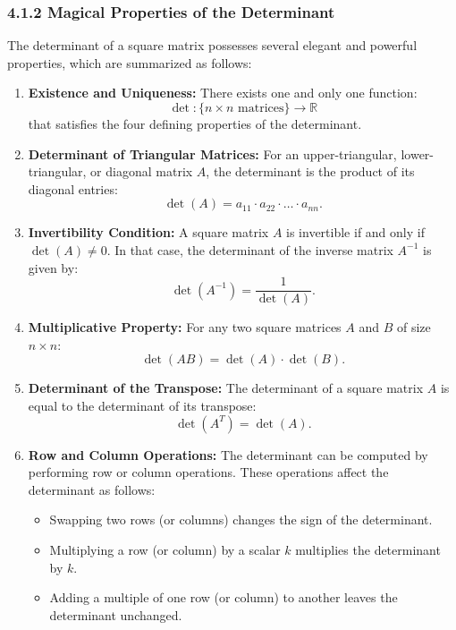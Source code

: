 \documentclass[a4paper,12pt]{article}
\begin{document}
\subsubsection*{4.1.2 Magical Properties of the Determinant}

The determinant of a square matrix possesses several elegant and powerful properties, which are summarized as follows:

\begin{enumerate}
    \item \textbf{Existence and Uniqueness:}  
    There exists one and only one function:  
    \[
    \det: \{n \times n \text{ matrices}\} \to \mathbb{R}
    \]
    that satisfies the four defining properties of the determinant.

    \item \textbf{Determinant of Triangular Matrices:}  
    For an upper-triangular, lower-triangular, or diagonal matrix \( A \), the determinant is the product of its diagonal entries:  
    \[
    \det(A) = a_{11} \cdot a_{22} \cdot \dots \cdot a_{nn}.
    \]

    \item \textbf{Invertibility Condition:}  
    A square matrix \( A \) is invertible if and only if \( \det(A) \neq 0 \). In that case, the determinant of the inverse matrix \( A^{-1} \) is given by:  
    \[
    \det(A^{-1}) = \frac{1}{\det(A)}.
    \]

    \item \textbf{Multiplicative Property:}  
    For any two square matrices \( A \) and \( B \) of size \( n \times n \):  
    \[
    \det(AB) = \det(A) \cdot \det(B).
    \]

    \item \textbf{Determinant of the Transpose:}  
    The determinant of a square matrix \( A \) is equal to the determinant of its transpose:  
    \[
    \det(A^T) = \det(A).
    \]

    \item \textbf{Row and Column Operations:}  
    The determinant can be computed by performing row or column operations. These operations affect the determinant as follows:
    \begin{itemize}
        \item Swapping two rows (or columns) changes the sign of the determinant.
        \item Multiplying a row (or column) by a scalar \( k \) multiplies the determinant by \( k \).
        \item Adding a multiple of one row (or column) to another leaves the determinant unchanged.
    \end{itemize}
\end{enumerate}
\end{document}
